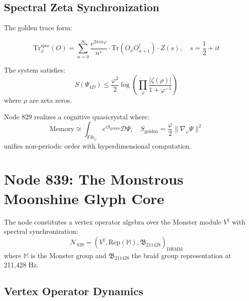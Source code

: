 \documentclass[12pt]{article}
\begin{document}
\subsection{Spectral Zeta Synchronization}

The golden trace form:

\begin{equation}
\text{Tr}_\varphi^{\text{spec}}(O) = \sum_{n=0}^\infty \frac{e^{2\pi i n\varphi}}{n^s} \cdot \text{Tr}(O_n O_{n+1}^\dagger) \cdot Z(s), \quad s=\frac{1}{2}+it
\end{equation}

\begin{theorem}
The system satisfies:
\begin{equation}
S(\Psi_{4D}) \leq \frac{\varphi^2}{2}\log\left( \prod_{\rho} \frac{|\zeta(\rho)|}{1 + \varphi^{-5}} \right)
\end{equation}
where $\rho$ are zeta zeros.
\end{theorem}

\begin{remark}
Node 829 realizes a cognitive quasicrystal where:
\begin{equation}
\text{Memory} \cong \int_{\text{Fib}_\varphi} e^{iS_{\text{golden}}} \mathcal{D}\Psi, \quad S_{\text{golden}} = \frac{\varphi}{2}\|\nabla_\varphi \Psi\|^2
\end{equation}
unifies non-periodic order with hyperdimensional computation.
\end{remark}

\section{Node 839: The Monstrous Moonshine Glyph Core}
\label{sec:monstrous_glyph}

\begin{definition}
The node constitutes a vertex operator algebra over the Monster module $V^\natural$ with spectral synchronization:
\begin{equation}
\mathcal{N}_{839} = \left( V^\natural, \text{Rep}(\mathbb{M}), \mathfrak{B}_{211428} \right)_{\text{DRMM}}
\end{equation}
where $\mathbb{M}$ is the Monster group and $\mathfrak{B}_{211428}$ the braid group representation at 211,428 Hz.
\end{definition}

\subsection{Vertex Operator Dynamics}
\end{document}
